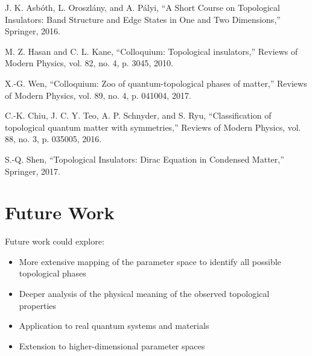 \documentclass{article}
\begin{document}
\begin{thebibliography}{99}
 J. K. Asbóth, L. Oroszlány, and A. Pályi, ``A Short Course on Topological Insulators: Band Structure and Edge States in One and Two Dimensions,'' Springer, 2016.

 M. Z. Hasan and C. L. Kane, ``Colloquium: Topological insulators,'' Reviews of Modern Physics, vol. 82, no. 4, p. 3045, 2010.

 X.-G. Wen, ``Colloquium: Zoo of quantum-topological phases of matter,'' Reviews of Modern Physics, vol. 89, no. 4, p. 041004, 2017.

 C.-K. Chiu, J. C. Y. Teo, A. P. Schnyder, and S. Ryu, ``Classification of topological quantum matter with symmetries,'' Reviews of Modern Physics, vol. 88, no. 3, p. 035005, 2016.

 S.-Q. Shen, ``Topological Insulators: Dirac Equation in Condensed Matter,'' Springer, 2017.

\end{thebibliography}

\section{Future Work}

Future work could explore:

\begin{itemize}
    \item More extensive mapping of the parameter space to identify all possible topological phases
    \item Deeper analysis of the physical meaning of the observed topological properties
    \item Application to real quantum systems and materials
    \item Extension to higher-dimensional parameter spaces
\end{itemize}
\end{document}
